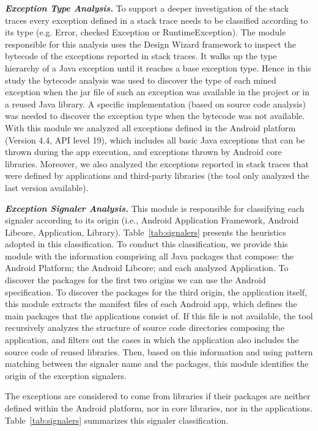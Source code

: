 \emph{\textbf{Exception Type Analysis.}} To support a deeper investigation of the 
stack traces every exception defined in a stack trace needs to be classified according to its type
(e.g. Error, checked Exception or RuntimeException). The module responsible for this analysis 
uses the Design Wizard framework \cite{Brunet09} to inspect the bytecode of the exceptions reported 
in stack traces.  It walks up the type hierarchy of a Java exception until it reaches 
a base exception type. Hence in this study the bytecode analysis was used to discover the type 
of each mined exception when the jar file of such an exception was available in the project or 
in a reused  Java library. A specific implementation (based on source code analysis)
 was needed to discover the exception type when the bytecode was not available.
With this module we analyzed all exceptions defined in the Android platform (Version 4.4, API level 19),
which includes all basic Java exceptions that can be thrown during the app execution,
and exceptions thrown by Android core libraries. Moreover, we also analyzed the 
exceptions reported in stack traces that were defined by applications and third-party libraries 
(the tool only analyzed the last version available).

\emph{\textbf{Exception Signaler Analysis.}}
This module is responsible for classifying each signaler according 
to its origin (i.e., Android Application Framework, Android Libcore, Application, Library). 
Table~\ref{tab:signalers} presents the heuristics adopted in this classification.
To conduct this classification, we provide this module with the information
comprising all Java packages that compose: the Android Platform;
 the Android Libcore; and each analyzed Application. To discover the packages for the first two origins
we can use the Android specification.
To discover the packages for the third origin, the application itself, this module
extracts the manifest files of each Android app, which defines the main packages that the applications consist of.
 If this file is not available, the tool recursively analyzes the 
structure of source code directories composing the application, and filters out the cases in which the application also includes the source code of reused libraries.
Then, based on this information and using pattern matching 
between the signaler name and the packages, this module identifies 
the origin of the exception signalers. 

The exceptions are considered to come
 from libraries if their packages are neither defined 
within the Android platform, nor in core libraries, nor in the applications.
Table~\ref{tab:signalers} summarizes this signaler classification.

